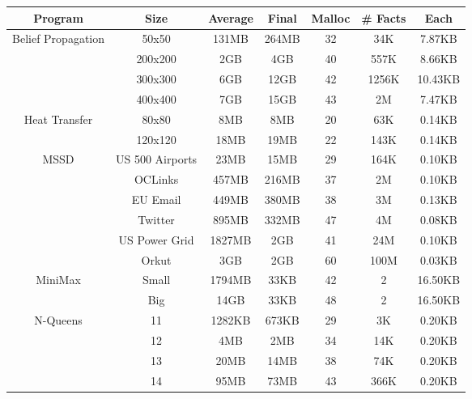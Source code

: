 \begin{tabular}{c | c || c | c | c || c c} \hline
	\textbf{Program} & \textbf{Size} & \textbf{Average} & \textbf{Final} & \textbf{Malloc} & \textbf{\# Facts} & \textbf{Each} \\ \hline \hline
	\multirow{4}{*}{Belief Propagation}  & 50x50 & 131MB & 264MB & 32 & 34K & 7.87KB \\
		 & 200x200 & 2GB & 4GB & 40 & 557K & 8.66KB \\
		 & 300x300 & 6GB & 12GB & 42 & 1256K & 10.43KB \\
		 & 400x400 & 7GB & 15GB & 43 & 2M & 7.47KB \\
	\hline
	\multirow{2}{*}{Heat Transfer}  & 80x80 & 8MB & 8MB & 20 & 63K & 0.14KB \\
		 & 120x120 & 18MB & 19MB & 22 & 143K & 0.14KB \\
	\hline
	\multirow{6}{*}{MSSD}  & US 500 Airports & 23MB & 15MB & 29 & 164K & 0.10KB \\
		 & OCLinks & 457MB & 216MB & 37 & 2M & 0.10KB \\
		 & EU Email & 449MB & 380MB & 38 & 3M & 0.13KB \\
		 & Twitter & 895MB & 332MB & 47 & 4M & 0.08KB \\
		 & US Power Grid & 1827MB & 2GB & 41 & 24M & 0.10KB \\
		 & Orkut & 3GB & 2GB & 60 & 100M & 0.03KB \\
	\hline
	\multirow{2}{*}{MiniMax}  & Small & 1794MB & 33KB & 42 & 2 & 16.50KB \\
		 & Big & 14GB & 33KB & 48 & 2 & 16.50KB \\
	\hline
	\multirow{4}{*}{N-Queens}  & 11 & 1282KB & 673KB & 29 & 3K & 0.20KB \\
		 & 12 & 4MB & 2MB & 34 & 14K & 0.20KB \\
		 & 13 & 20MB & 14MB & 38 & 74K & 0.20KB \\
		 & 14 & 95MB & 73MB & 43 & 366K & 0.20KB \\
	\hline
\end{tabular}
